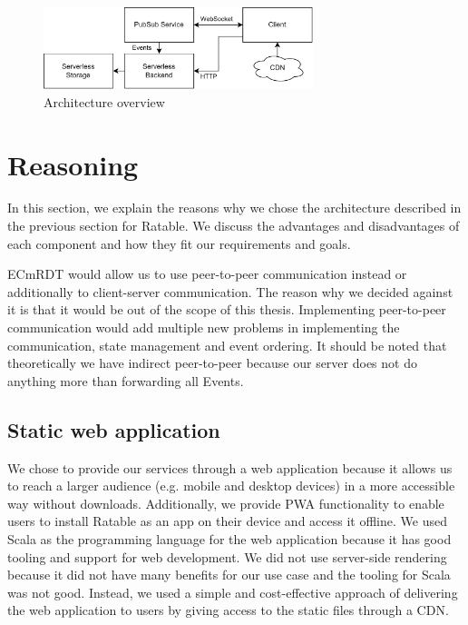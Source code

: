 \documentclass[
	ngerman,
	ruledheaders=section,   %
	class=report,		    %
	thesis={type=bachelor}, %
	accentcolor=9c,			%
	custommargins=true,    %
	marginpar=false,        %
	parskip=half-,          %
	fontsize=11pt,          %
]{tudapub}
\begin{document}
\begin{figure}[h]
  \centering
  \includegraphics[width=0.7\textwidth]{architecture_services.png}
  \caption{Architecture overview}
\end{figure}

\section{Reasoning}
In this section, we explain the reasons why we chose the architecture described in the previous section for Ratable. We discuss the advantages and disadvantages of each component and how they fit our requirements and goals.

ECmRDT would allow us to use peer-to-peer communication instead or additionally to client-server communication. The reason why we decided against it is that it would be out of the scope of this thesis. Implementing peer-to-peer communication would add multiple new problems in implementing the communication, state management and event ordering. It should be noted that theoretically we have indirect peer-to-peer because our server does not do anything more than forwarding all Events.

\subsection{Static web application}
We chose to provide our services through a web application because it allows us to reach a larger audience (e.g. mobile and desktop devices) in a more accessible way without downloads. Additionally, we provide PWA functionality to enable users to install Ratable as an app on their device and access it offline. We used Scala as the programming language for the web application because it has good tooling and support for web development. We did not use server-side rendering because it did not have many benefits for our use case and the tooling for Scala was not good. Instead, we used a simple and cost-effective approach of delivering the web application to users by giving access to the static files through a CDN.
\end{document}

